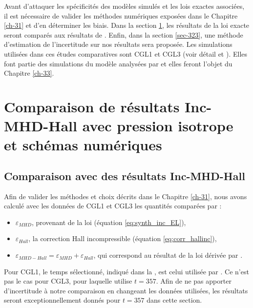   Avant d'attaquer les spécificités des modèles simulés et les lois exactes associées, il est nécessaire de valider les méthodes numériques exposées dans le Chapitre \ref{ch-31} et d'en déterminer les biais. Dans la section \ref{sec-321}, les résultats de la loi exacte  seront comparés aux résultats de . %
  Enfin, dans la section \ref{sec-323}, une méthode d'estimation de l'incertitude sur nos résultats sera proposée. 
  Les simulations utilisées dans ces études comparatives sont CGL1 et CGL3 (voir détail  et ). Elles font partie des simulations du modèle  analysées par  et elles feront l'objet du Chapitre \ref{ch-33}.  

  
 

 \section{Comparaison de résultats Inc-MHD-Hall avec pression isotrope et schémas numériques}
 \label{sec-321}
 
 \subsection{Comparaison avec des  résultats Inc-MHD-Hall}

 Afin de valider les méthodes et choix décrits dans le Chapitre \ref{ch-31}, nous avons calculé avec les données de CGL1 et CGL3 les quantités comparées par  : 
 \begin{itemize}
     \item $\varepsilon_{MHD}$, provenant de la loi  (équation \eqref{eq:synth_inc_EL}),
     \item $\varepsilon_{Hall}$, la correction Hall incompressible (équation \eqref{eq:corr_hallinc}),
     \item $\varepsilon_{MHD-Hall} = \varepsilon_{MHD} + \varepsilon_{Hall}$, qui correspond au résultat de la loi  dérivée par \cite{ferrand_exact_2019}.
 \end{itemize} 
 Pour CGL1, le temps sélectionné, indiqué dans la , est celui utilisée par . Ce n'est pas le cas pour CGL3, pour laquelle  utilise $t =\num{357}$. Afin de ne pas apporter d'incertitude à notre comparaison en changeant les données utilisées, les résultats seront exceptionnellement donnés pour $t =\num{357}$ dans cette section. 
 
